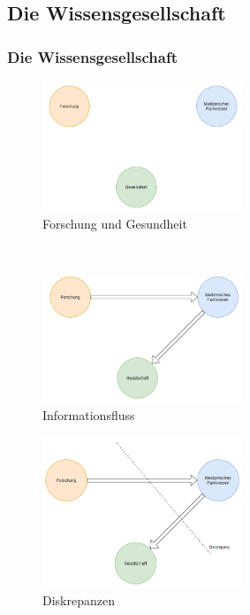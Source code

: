 \documentclass[xcolor=dvipsnames]{beamer}
\begin{document}
    \subsection{Die Wissensgesellschaft}
    \begin{frame}[allowframebreaks]
        \frametitle{Die Wissensgesellschaft}
        \begin{figure}
            \centering
            \includegraphics[width=6cm]{../images/wissensgesellschaft_1.png}
            \caption{Forschung und Gesundheit}
        \end{figure}

        \framebreak

        ~\\
        \begin{figure}
            \centering
            \includegraphics[width=6cm]{../images/wissensgesellschaft_2.png}
            \caption{Informationsfluss}
        \end{figure}

        \begin{figure}
            \centering
            \includegraphics[width=6cm]{../images/wissensgesellschaft_3.png}
            \caption{Diskrepanzen}
        \end{figure}


\end{frame}
\end{document}
